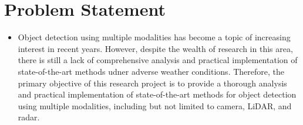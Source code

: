\documentclass[rnd]{mas_proposal}
\begin{document}
\section{Problem Statement}
\begin{itemize}



      \item Object detection using multiple modalities has become a topic of increasing interest in recent years. However, despite the wealth of research in this area, there is still a lack of comprehensive analysis and practical implementation of state-of-the-art methods udner adverse weather conditions. Therefore, the primary objective of this research project is to provide a thorough analysis and practical implementation of state-of-the-art methods for object detection using multiple modalities, including but not limited to camera, LiDAR, and radar.


\end{itemize}
\end{document}
